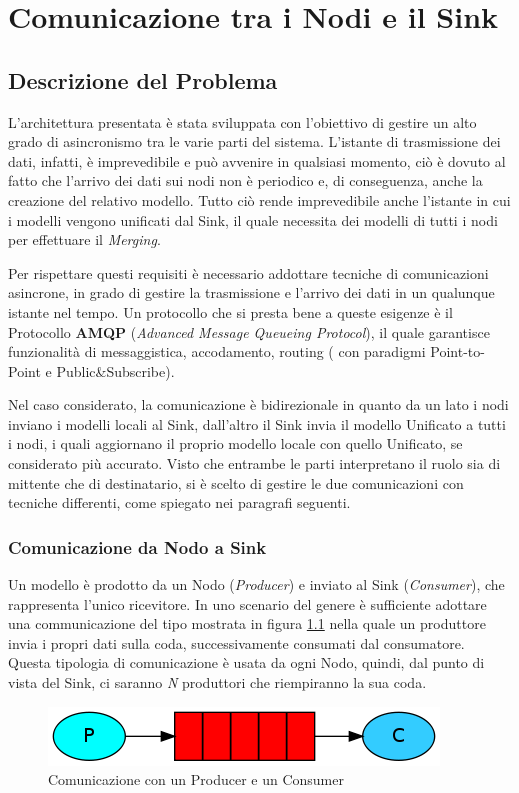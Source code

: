 \chapter{Comunicazione tra i Nodi e il Sink}
  \section{Descrizione del Problema}
    L'architettura presentata è stata sviluppata con l'obiettivo di gestire un alto grado di asincronismo tra le varie parti del sistema. L'istante di trasmissione dei dati, infatti, è imprevedibile e può avvenire in qualsiasi momento, ciò è dovuto al fatto che l'arrivo dei dati sui nodi non è periodico e, di conseguenza, anche la creazione del relativo modello. Tutto ciò rende imprevedibile anche l'istante in cui i modelli vengono unificati dal Sink, il quale necessita dei modelli di tutti i nodi per effettuare il \textit{Merging}.  \newline

    Per rispettare questi requisiti è necessario addottare tecniche di comunicazioni asincrone, in grado di gestire la trasmissione e l'arrivo dei dati in un qualunque istante nel tempo. Un protocollo che si presta bene a queste esigenze è il Protocollo \textbf{AMQP} (\textit{Advanced Message Queueing Protocol}), il quale garantisce funzionalità di messaggistica, accodamento, routing ( con paradigmi Point-to-Point e Public\&Subscribe). \newline

    Nel caso considerato, la comunicazione è bidirezionale in quanto da un lato i nodi inviano i modelli locali al Sink, dall'altro il Sink invia il modello Unificato a tutti i nodi, i quali aggiornano il proprio modello locale con quello Unificato, se considerato più accurato. Visto che entrambe le parti interpretano il ruolo sia di mittente che di destinatario, si è scelto di gestire le due comunicazioni con tecniche differenti, come spiegato nei paragrafi seguenti.
    \subsection{Comunicazione da Nodo a Sink}
      Un modello è prodotto da un Nodo (\textit{Producer}) e inviato al Sink (\textit{Consumer}), che rappresenta l'unico ricevitore. In uno scenario del genere è sufficiente adottare una communicazione del tipo mostrata in figura \ref{fig:ProducerConsumer} nella quale un produttore invia i propri dati sulla coda, successivamente consumati dal consumatore. Questa tipologia di comunicazione è usata da ogni Nodo, quindi, dal punto di vista del Sink, ci saranno \textit{N} produttori che riempiranno la sua coda.
      \begin{figure}[h!]
        \centering
        \includegraphics[scale=0.7]{../Immagini/ProducerConsumer.png}
        \caption{Comunicazione con un Producer e un Consumer}
        \label{fig:ProducerConsumer}
      \end{figure}

